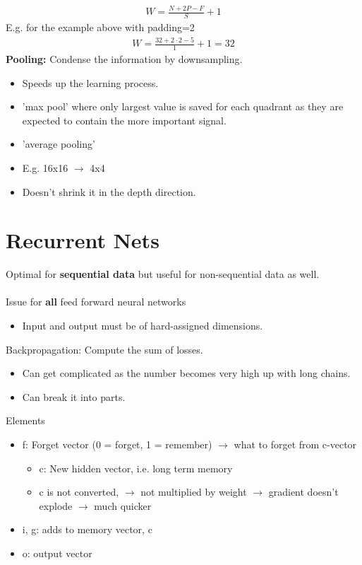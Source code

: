 \documentclass[12pt, a4paper]{article}
\begin{document}
\begin{spacing}{1.213}
\begin{multicols}{2}
\begin{align*}
  W=\frac{N+2P-F}{S}+1
\end{align*}
E.g. for the example above with padding=2
\begin{align*}
 W=\frac{32+2\cdot2-5}{1}+1=32
\end{align*}
\textbf{Pooling:} Condense the information by downsampling.
\begin{itemize}
  \item Speeds up the learning process.
  \item 'max pool' where only largest value is saved for each quadrant as they are expected to contain the more important signal.
  \item 'average pooling'
  \item E.g. 16x16 $\rightarrow$ 4x4
  \item Doesn't shrink it in the depth direction.
\end{itemize}

\end{multicols}

\section{Recurrent Nets}
\begin{multicols}{2}\noindent
Optimal for \textbf{sequential data} but useful for non-sequential data as well.
\\ \\
Issue for \textbf{all} feed forward neural networks
\begin{itemize}
  \item Input and output must be of hard-assigned dimensions.
\end{itemize}
Backpropagation: Compute the sum of losses.
\begin{itemize}
  \item Can get complicated as the number becomes very high up with long chains.
  \item Can break it into parts.
\end{itemize}
Elements
\begin{itemize}
  \item f: Forget vector (0 = forget, 1 = remember) $\rightarrow$ what to forget from c-vector
  \begin{itemize}
    \item c: New hidden vector, i.e. long term memory
    \item c is not converted, $\rightarrow$ not multiplied by weight $\rightarrow$ gradient doesn't explode $\rightarrow$ much quicker
  \end{itemize}
  \item i, g: adds to memory vector, c
  \item o: output vector
\end{itemize}

\end{multicols}


\end{spacing}
\end{document}
